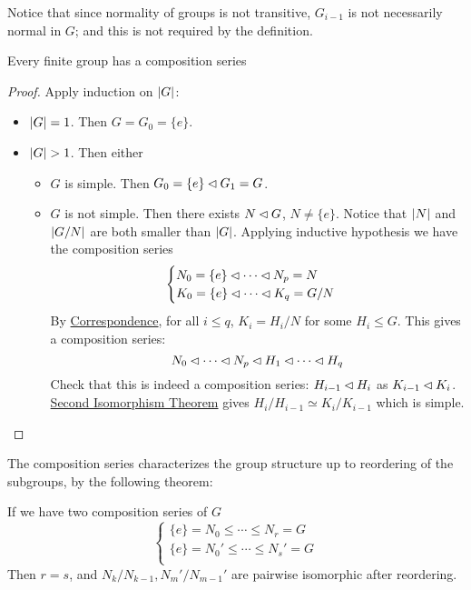 \documentclass{article}
\begin{document}
\begin{remark}
    Notice that since normality of groups is not transitive, $G_{i-1}$ is not necessarily normal in $G$; and this is not required by the definition.
\end{remark}

\begin{proposition}
    Every finite group has a composition series
\end{proposition}

\begin{proof}
    Apply induction on $\left|G\right|$:
    \begin{itemize}
        \item $\left|G\right| = 1$. Then $G = G_0 = \{e\}$. 
        \item $\left|G\right| > 1$. Then either
        \begin{itemize}
            \item $G$ is simple. Then $G_0 = \{e\} \lhd G_1 = G$.
            \item $G$ is not simple. Then there exists $N \lhd G$, $N \neq \{e\}$. Notice that $\left|N\right|$ and $\left|G/N\right|$ are both smaller than $\left|G\right|$. Applying inductive hypothesis we have the composition series
            \[
                \begin{cases}
                    N_0 = \{e\} \lhd \cdots \lhd N_p = N \\
                    K_0 = \{e\} \lhd \cdots \lhd K_q = G/N
                \end{cases}
            \]
            By \hyperref[thm: correspondence]{Correspondence}, for all $i \leq q$, $K_i = H_i/N$ for some $H_i \leq G$. This gives a composition series:
            \[
                N_0 \lhd \cdots \lhd N_p \lhd H_1 \lhd \cdots \lhd H_q
            \]
            Check that this is indeed a composition series: $H_{i-1} \lhd H_i$ as $K_{i-1} \lhd K_i$. \hyperref[thm: second isomorphism theorem]{Second Isomorphism Theorem} gives $H_i/H_{i-1} \simeq K_i/K_{i-1}$ which is simple.
        \end{itemize}
    \end{itemize}
\end{proof}

\textstart
The composition series characterizes the group structure up to reordering of the subgroups, by the following theorem:

\begin{theorem}
    If we have two composition series of $G$
    \[
        \begin{cases}
            \{e\} = N_0 \leq \cdots \leq N_r = G \\
            \{e\} = N_0' \leq \cdots \leq N_s' = G \\
        \end{cases}
    \]
    Then $r = s$, and $N_k/N_{k-1}, N_m'/N_{m-1}'$ are pairwise isomorphic after reordering.
\end{theorem}
\end{document}

